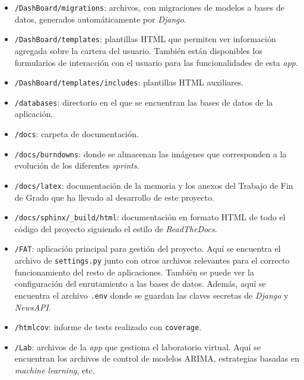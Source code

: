 \begin{itemize}
\item 
\texttt{/DashBoard/migrations}: archivos, con migraciones de modelos a bases de datos, generados automáticamente por \emph{Django}.

\item 
\texttt{/DashBoard/templates}: plantillas HTML que permiten ver información agregada sobre la cartera del usuario. También están disponibles los formularios de interacción con el usuario para las funcionalidades de esta \emph{app}.

\item 
\texttt{/DashBoard/templates/includes}: plantillas HTML auxiliares.

\item 
\texttt{/databases}: directorio en el que se encuentran las bases de datos de la aplicación. 

\item 
\texttt{/docs}: carpeta de documentación. 

\item 
\texttt{/docs/burndowns}: donde se almacenan las imágenes que corresponden a la evolución de los diferentes \emph{sprints}.

\item 
\texttt{/docs/latex}: documentación de la memoria y los anexos del Trabajo de Fin de Grado que ha llevado al desarrollo de este proyecto. 

\item 
\texttt{/docs/sphinx/_build/html}: documentación en formato HTML de todo el código del proyecto siguiendo el estilo de \emph{ReadTheDocs}.

\item 
\texttt{/FAT}: aplicación principal para gestión del proyecto. Aquí se encuentra el archivo de \texttt{settings.py} junto con otros archivos relevantes para el correcto funcionamiento del resto de aplicaciones. También se puede ver la configuración del enrutamiento a las bases de datos. Además, aquí se encuentra el archivo \texttt{.env} donde se guardan las claves secretas de \emph{Django} y \emph{NewsAPI}.

\item 
\texttt{/htmlcov}: informe de tests realizado con \texttt{coverage}.

\item 
\texttt{/Lab}: archivos de la \emph{app} que gestiona el laboratorio virtual. Aquí se encuentran los archivos de control de modelos ARIMA, estrategias basadas en \emph{machine learning}, etc. 


\end{itemize}
